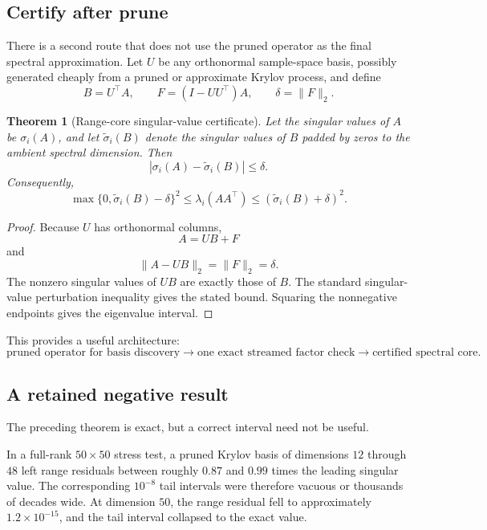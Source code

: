 \documentclass[11pt]{article}
\newtheorem{theorem}{Theorem}[section]
\theoremstyle{definition}
\theoremstyle{remark}
\begin{document}
\subsection{Certify after prune}

There is a second route that does not use the pruned operator as the final
spectral approximation.  Let \(U\) be any orthonormal sample-space basis,
possibly generated cheaply from a pruned or approximate Krylov process, and
define
\[
B=U^\top A,
\qquad
F=(I-UU^\top)A,
\qquad
\delta=\|F\|_2.
\]

\begin{theorem}[Range-core singular-value certificate]
Let the singular values of \(A\) be \(\sigma_i(A)\), and let
\(\widetilde\sigma_i(B)\) denote the singular values of \(B\) padded by zeros
to the ambient spectral dimension.  Then
\[
\boxed{
\left|
\sigma_i(A)
-
\widetilde\sigma_i(B)
\right|
\le
\delta.
}
\]
Consequently,
\[
\max\{0,\widetilde\sigma_i(B)-\delta\}^2
\le
\lambda_i(AA^\top)
\le
\left(
\widetilde\sigma_i(B)+\delta
\right)^2.
\]
\end{theorem}

\begin{proof}
Because \(U\) has orthonormal columns,
\[
A=UB+F
\]
and
\[
\|A-UB\|_2=\|F\|_2=\delta.
\]
The nonzero singular values of \(UB\) are exactly those of \(B\).
The standard singular-value perturbation inequality gives the stated bound.
Squaring the nonnegative endpoints gives the eigenvalue interval.
\end{proof}

This provides a useful architecture:
\[
\boxed{
\text{pruned operator for basis discovery}
\to
\text{one exact streamed factor check}
\to
\text{certified spectral core}.
}
\]

\subsection{A retained negative result}

The preceding theorem is exact, but a correct interval need not be useful.

In a full-rank \(50\times50\) stress test, a pruned Krylov basis of dimensions
\(12\) through \(48\) left range residuals between roughly \(0.87\) and
\(0.99\) times the leading singular value.  The corresponding \(10^{-8}\)
tail intervals were therefore vacuous or thousands of decades wide.  At
dimension \(50\), the range residual fell to approximately
\(1.2\times10^{-15}\), and the tail interval collapsed to the exact value.
\end{document}
